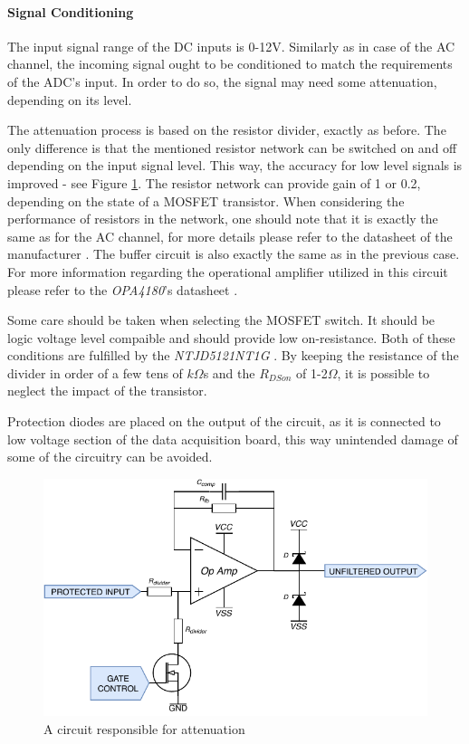 \documentclass[12pt,a4paper]{article}
\begin{document}
\paragraph{Signal Conditioning}
The input signal range of the DC inputs is 0-12V. Similarly as in case of the AC channel, the incoming signal ought to be conditioned to match the requirements of the ADC's input. In order to do so, the signal may need some attenuation, depending on its level.
\par
The attenuation process is based on the resistor divider, exactly as before. The only difference is that the mentioned resistor network can be switched on and off depending on the input signal level. This way, the accuracy for low level signals is improved - see Figure \ref{fig:input3}. The resistor network can provide gain of 1 or 0.2, depending on the state of a MOSFET transistor. When considering the performance of resistors in the network, one should note that it is exactly the same as for the AC channel, for more details please refer to the datasheet of the manufacturer \cite{resistors}. The buffer circuit is also exactly the same as in the previous case. For more information regarding the operational amplifier utilized in this circuit please refer to the \textit{OPA4180}'s datasheet \cite{opa4180_params}.\par
Some care should be taken when selecting the MOSFET switch. It should be logic voltage level compaible and should provide low on-resistance. Both of these conditions are fulfilled by the \textit{NTJD5121NT1G} \cite{mosfet_params}. By keeping the resistance of the divider in order of a few tens of $k\Omega$s and the $R_{DSon}$ of 1-2$\Omega$, it is possible to neglect the impact of the transistor.\par
Protection diodes are placed on the output of the circuit, as it is connected to low voltage section of the data acquisition board, this way unintended damage of some of the circuitry can be avoided.
\begin{figure}[ht!]
\includegraphics[scale=1.2]{input3.pdf}
\caption{A circuit responsible for attenuation}
\label{fig:input3}
\end{figure}
\par
\end{document}
